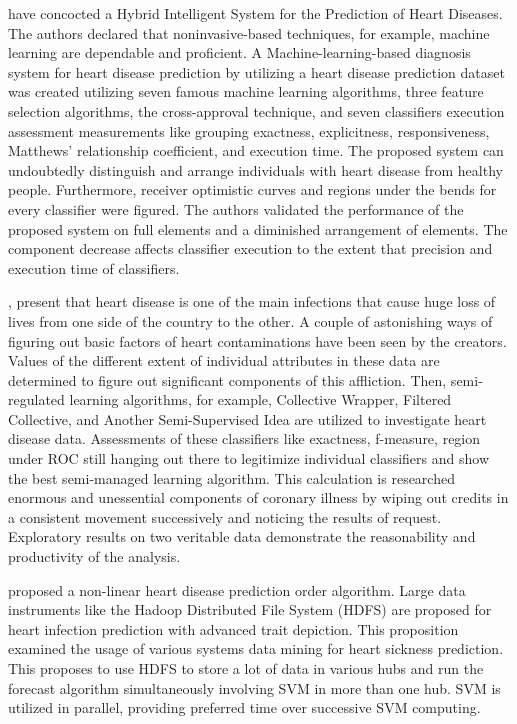 {\citealp{haq2018hybrid} have concocted a Hybrid Intelligent System for the Prediction of Heart Diseases. The authors declared that noninvasive-based techniques, for example, machine learning are dependable and proficient. A Machine-learning-based diagnosis system for heart disease prediction by utilizing a heart disease prediction dataset was created utilizing seven famous machine learning algorithms, three feature selection algorithms, the cross-approval technique, and seven classifiers execution assessment measurements like grouping exactness, explicitness, responsiveness, Matthews' relationship coefficient, and execution time. The proposed system can undoubtedly distinguish and arrange individuals with heart disease from healthy people. Furthermore, receiver optimistic curves and regions under the bends for every classifier were figured. The authors validated the performance of the proposed system on full elements and a diminished arrangement of elements. The component decrease affects classifier execution to the extent that precision and execution time of classifiers.

\citealp{satu2018exploring}, present that heart disease is one of the main infections that cause huge loss of lives from one side of the country to the other. A couple of astonishing ways of figuring out basic factors of heart contaminations have been seen by the creators. Values of the different extent of individual attributes in these data are determined to figure out significant components of this affliction. Then, semi-regulated learning algorithms, for example, Collective Wrapper, Filtered Collective, and Another Semi-Supervised Idea are utilized to investigate heart disease data. Assessments of these classifiers like exactness, f-measure, region under ROC still hanging out there to legitimize individual classifiers and show the best semi-managed learning algorithm. This calculation is researched enormous and unessential components of coronary illness by wiping out credits in a consistent movement successively and noticing the results of request. Exploratory results on two veritable data demonstrate the reasonability and productivity of the analysis.

\citeauthor{sharmila2015survey} proposed a non-linear heart disease prediction order algorithm. Large data instruments like the Hadoop Distributed File System (HDFS) are proposed for heart infection prediction with advanced trait depiction. This proposition examined the usage of various systems data mining for heart sickness prediction. This proposes to use HDFS to store a lot of data in various hubs and run the forecast algorithm simultaneously involving SVM in more than one hub. SVM is utilized in parallel, providing preferred time over successive SVM computing.
}



